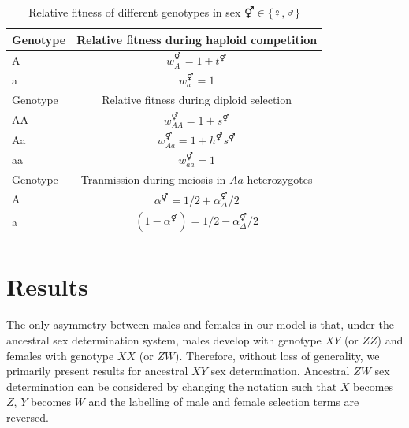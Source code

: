 \documentclass[12pt]{article}
\begin{document}
\begin{table}[ht]
\centering
\smallskip
\caption{Relative fitness of different genotypes in sex $\Hermaphrodite \in \{\female,\male\}$}
\begin{tabular}{l c }
\hline\hline
  Genotype & Relative fitness during haploid competition \\ [0.5ex] \hline
  A & $w_{A}^\Hermaphrodite = 1+t^\Hermaphrodite$ \\
  a & $w_{a}^\Hermaphrodite = 1$ \\ [0.5ex] \hline
  Genotype & Relative fitness during diploid selection \\ [0.5ex] \hline
  AA & $w_{AA}^\Hermaphrodite = 1+ s^\Hermaphrodite$ \\
  Aa & $w_{Aa}^\Hermaphrodite = 1+h^\Hermaphrodite s^\Hermaphrodite$ \\
  aa & $w_{aa}^\Hermaphrodite = 1$ \\ [0.5ex] \hline
  Genotype & Tranmission during meiosis in $Aa$ heterozygotes \\ [0.5ex] \hline
  A & $\alpha^\Hermaphrodite=1/2+\alpha_{\Delta}^{\Hermaphrodite}/2$ \\
  a & $(1-\alpha^\Hermaphrodite)=1/2-\alpha_{\Delta}^{\Hermaphrodite}/2$ \\
  \hline \hline
  \label{tab:fitnesstable}
 \end{tabular}
\end{table}


\section*{Results}

The only asymmetry between males and females in our model is that, under the ancestral sex determination system, males develop with genotype $XY$ (or $ZZ$) and females with genotype $XX$ (or $ZW$). 
Therefore, without loss of generality, we primarily present results for ancestral $XY$ sex determination. 
Ancestral $ZW$ sex determination can be considered by changing the notation such that $X$ becomes $Z$, $Y$ becomes $W$ and the labelling of male and female selection terms are reversed. 
\end{document}
